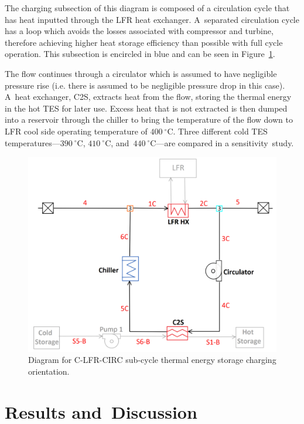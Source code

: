\documentclass[sustainability,article,accept,moreauthors,pdftex]{Definitions/mdpi}
\begin{document}
\begin{paracol}{2}
\switchcolumn

The charging subsection of this diagram is composed of a circulation cycle that has heat inputted through the LFR heat exchanger. A~separated circulation cycle has a loop which avoids the losses associated with compressor and turbine, therefore achieving higher heat storage efficiency than possible with full cycle operation. This subsection is encircled in blue and can be seen in Figure~\ref{c-lfr-circ-sub}.

The flow continues through a circulator which is assumed to have negligible pressure rise (i.e. there is assumed to be negligible pressure drop in this case). A~heat exchanger, C2S, extracts heat from the flow, storing the thermal energy in the hot TES for later use. Excess heat that is not extracted is then dumped into a reservoir through the chiller to bring the temperature of the flow down to LFR cool side operating temperature of $400~^{\circ}$C. Three different cold TES temperatures---$390~^{\circ}$C, $410~^{\circ}$C, and~$440~^{\circ}$C---are compared in a sensitivity~study. 

\begin{figure}[H]
    \includegraphics[width=0.7\linewidth]{Definitions/c-lfr-circ-sub.pdf}
    \caption{Diagram for C-LFR-CIRC sub-cycle thermal energy storage charging orientation\label{c-lfr-circ-sub}.}
\end{figure}




\section{Results and~Discussion}


\end{paracol}
\end{document}
